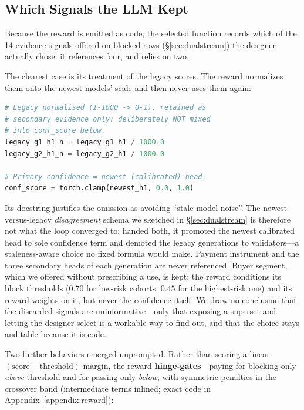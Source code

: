 \documentclass[11pt]{article}
\begin{document}
\subsection{Which Signals the LLM Kept}
\label{sec:whatlearned}
Because the reward is emitted as code, the selected function records which of the 14 evidence
signals offered on blocked rows (\S\ref{sec:dualstream}) the designer actually chose: it
references four, and relies on two.

The clearest case is its treatment of the legacy scores. The reward normalizes them onto the
newest models' scale and then never uses them again:

\begin{lstlisting}[language=Python, basicstyle=\ttfamily\scriptsize, backgroundcolor=\color{highlight}, numbers=none, frame=none]
# Legacy normalised (1-1000 -> 0-1), retained as
# secondary evidence only: deliberately NOT mixed
# into conf_score below.
legacy_g1_h1_n = legacy_g1_h1 / 1000.0
legacy_g2_h1_n = legacy_g2_h1 / 1000.0

# Primary confidence = newest (calibrated) head.
conf_score = torch.clamp(newest_h1, 0.0, 1.0)
\end{lstlisting}

\noindent Its docstring justifies the omission as avoiding ``stale-model noise''. The
newest-versus-legacy \emph{disagreement} schema we sketched in \S\ref{sec:dualstream} is therefore
not what the loop converged to: handed both, it promoted the newest calibrated head to sole
confidence term and demoted the legacy generations to validators---a staleness-aware choice no
fixed formula would make. Payment instrument and the three secondary heads of each generation are
never referenced. Buyer segment, which we offered without prescribing a use, is kept: the reward
conditions its block thresholds ($0.70$ for low-risk cohorts, $0.45$ for the highest-risk one) and
its reward weights on it, but never the confidence itself. We draw no conclusion that
the discarded signals are uninformative---only that exposing a superset and letting the designer
select is a workable way to find out, and that the choice stays auditable because it is code.

Two further behaviors emerged unprompted. Rather than scoring a linear
$(\text{score}-\text{threshold})$ margin, the reward \textbf{hinge-gates}---paying for blocking only
\emph{above} threshold and for passing only \emph{below}, with symmetric penalties in the crossover
band (intermediate terms inlined; exact code in Appendix~\ref{appendix:reward}):
\end{document}
